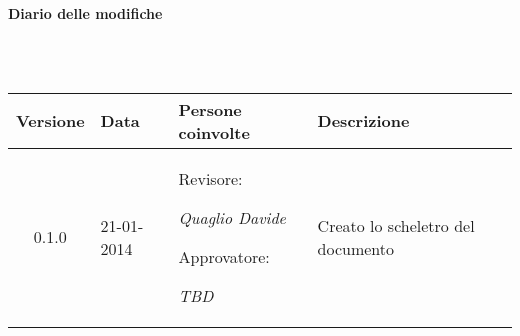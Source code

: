 \noindent\begin{Large}\textbf{Diario delle modifiche}\end{Large}\\
\\
\begin{small}
\begin{tabular}{|c|p{1.7cm}|p{2.8cm}|p{7cm}|}
\hline
Versione & Data & Persone coinvolte & Descrizione \\
\hline
\hline
0.1.0 & 21-01-2014 & Revisore: 

\textit{Quaglio Davide}

Approvatore: 

\textit{TBD} &  Creato lo scheletro del documento\\
\hline
\end{tabular}\\
\end{small}